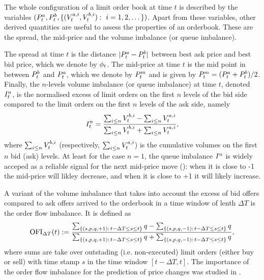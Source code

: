 \documentclass[10pt]{article}
\begin{document}
The whole configuration of a limit order book at time $t$ is described by the variables $(\bestAskPrice_t, \bestBidPrice_t, \lbrace (\nthBestAskVolume[i]_t, \nthBestBidVolume[i]_t) : \, \, i=1,2,\dots\rbrace)$. Apart from these variables, other derived quantities are useful to assess the properties of an orderbook. These are the spread, the mid-price and the volume imbalance (or queue imbalance). 

The spread at time $t$ is the distance $\lvert \bestAskPrice_t - \bestBidPrice_t \rvert$ between best ask price  and best bid price, which we denote by $\LOBspread_t$.  The mid-price at time $t$ is the mid point in between  $\bestBidPrice_t$ and $\bestAskPrice_{t}$, which we denote by $\price^{m}_t$ and is given by $\price^m_t = (\bestAskPrice_t + \bestBidPrice_{t})/{2}$.
Finally, the $n$-levels volume imbalance (or queue imbalance) at time $t$, denoted $\volumeImbalance^{n}_t$, is the normalised excess of limit orders on the first $n$ levels of the bid side compared to the limit orders on the first $n$ levels of the ask side, namely
\begin{equation}\label{eq.definition_volume_imbalance}
\volumeImbalance^{n}_t =
\frac{\sum_{i\leq n}\nthBestBidVolume[i]_t - \sum_{i\leq n}\nthBestAskVolume[i]_t}{\sum_{i\leq n}\nthBestBidVolume[i]_t + \sum_{i\leq n}\nthBestAskVolume[i]_t},
\end{equation}
where $\sum_{i\leq n}\nthBestBidVolume[i]_t$ (respectively, $\sum_{i\leq n}\nthBestAskVolume[i]_t$) is the cumulative volumes on the first $n$ bid (ask) levels. 
At least for the case $n=1$, the queue imbalance $\volumeImbalance^n$ is widely acceped as a reliable signal for the next mid-price move (\citealp{CDJ18enh}): when it is close to -1 the mid-price will likley decrease, and when it is close to +1 it will likely increase. 

A variant of the volume imbalance that takes into account the excess of bid offers compared to ask offers arrived to the orderbook in a time window of lenth $\Delta T$ is the order flow imbalance. It is defined as 
\begin{equation*}
 \OFI_{\Delta T}(t) : = \frac{\sum_{\lbrace (s,p,q,+1): \, t-\Delta T \leq s \leq t \rbrace} q -  \sum_{\lbrace (s,p,q,-1): \, t-\Delta T \leq s \leq t \rbrace} q}{\sum_{\lbrace (s,p,q,+1): \, t-\Delta T \leq s \leq t \rbrace} q +  \sum_{\lbrace (s,p,q,-1): \, t-\Delta T \leq s \leq t \rbrace} q},
\end{equation*}
where sums are take over outstading (i.e. non-executed) limit orders (either buy or sell) with time stamp $s$ in the time window $[t-\Delta T, t]$. The importance of the order flow imbalance for the prediction of price changes was studied in \citealp{CKS14pri}.
\end{document}
